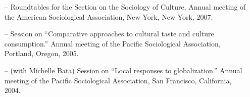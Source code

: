 \begin{itemize}[itemsep=-0.5ex]
    \item[--] Roundtables for the Section on the Sociology of Culture, Annual meeting of the American Sociological Association, New York, New York, 2007.
    \item[--] Session on ``Comparative approaches to cultural taste and culture consumption.'' Annual meeting of the Pacific Sociological Association, Portland, Oregon, 2005.
    \item[--] (with Michelle Bata) Session on ``Local responses to globalization.'' Annual meeting of the Pacific Sociological Association, San Francisco, California, 2004.
\end{itemize}